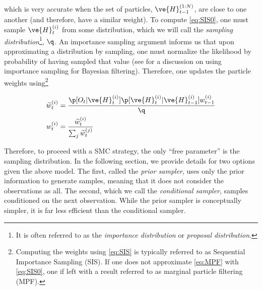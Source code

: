 \noindent which is very accurate when the set of particles, $\ve{H}_{t-1}^{(1:N)}$, are close to one another (and therefore, have a similar weight).  To compute \eqref{eq:SIS0}, one must sample $\ve{H}_t^{(i)}$ from some distribution, which we will call the \emph{sampling distribution}\footnote{It is often referred to as the \emph{importance distribution} or \emph{proposal distribution}.}, $\q$.  An importance sampling argument informs us that upon approximating a distribution by sampling, one must normalize the likelihood by probability of having sampled that value (see \cite{Geweke89} for a discussion on using importance sampling for Bayesian filtering).  Therefore, one updates the particle weights using\footnote{Computing the weights using \eqref{eq:SIS} is typically referred to as Sequential Importance Sampling (SIS)\cite{LiuChen98}.  If one does not approximate \eqref{eq:MPF} with \eqref{eq:SIS0}, one if left with a result referred to as marginal particle filtering (MPF)\cite{KlaasDoucet05}.}

\begin{subequations} \label{eq:SIS}
\begin{align} \label{eq:SISa}
\widetilde{w}_t^{(i)} &= \frac{\p[O_t | \ve{H}_t^{(i)}]  \p[\ve{H}_t^{(i)} | \ve{H}_{t-1}^{(i)}] w_{t-1}^{(i)}}{\q} %
\\ w_t^{(i)} &= \frac{\widetilde{w}_t^{(i)}}{\sum_j \widetilde{w}_t^{(j)}} \label{eq:SISb}
\end{align}
\end{subequations}

Therefore, to proceed with a SMC strategy, the only ``free parameter'' is the sampling distribution.  In the following section, we provide details for two options given the above model.  The first, called the \emph{prior sampler}, uses only the prior information to generate samples, meaning that it does not consider the observations as all.  The second, which we call the \emph{conditional sampler}, samples conditioned on the next observation.  While the prior sampler is conceptually simpler, it is far less efficient than the conditional sampler.

